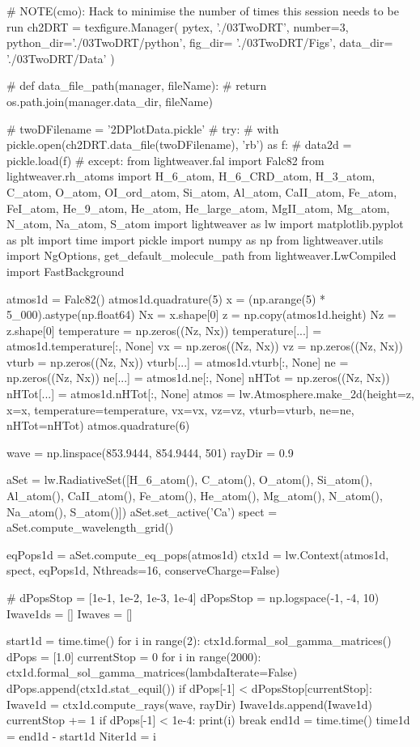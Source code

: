 \begin{pycode}[2DValidation]
# NOTE(cmo): Hack to minimise the number of times this session needs to be run
ch2DRT = texfigure.Manager(
    pytex,
    './03TwoDRT',
    number=3,
    python_dir='./03TwoDRT/python',
    fig_dir=   './03TwoDRT/Figs',
    data_dir=  './03TwoDRT/Data'
)

# def data_file_path(manager, fileName):
#     return os.path.join(manager.data_dir, fileName)

# twoDFilename = '2DPlotData.pickle'
# try:
#     with pickle.open(ch2DRT.data_file(twoDFilename), 'rb') as f:
#         data2d = pickle.load(f)
# except:
from lightweaver.fal import Falc82
from lightweaver.rh_atoms import H_6_atom, H_6_CRD_atom, H_3_atom, C_atom, O_atom, OI_ord_atom, Si_atom, Al_atom, CaII_atom, Fe_atom, FeI_atom, He_9_atom, He_atom, He_large_atom, MgII_atom, Mg_atom, N_atom, Na_atom, S_atom
import lightweaver as lw
import matplotlib.pyplot as plt
import time
import pickle
import numpy as np
from lightweaver.utils import NgOptions, get_default_molecule_path
from lightweaver.LwCompiled import FastBackground

atmos1d = Falc82()
atmos1d.quadrature(5)
x = (np.arange(5) * 5_000).astype(np.float64)
Nx = x.shape[0]
z = np.copy(atmos1d.height)
Nz = z.shape[0]
temperature = np.zeros((Nz, Nx))
temperature[...] = atmos1d.temperature[:, None]
vx = np.zeros((Nz, Nx))
vz = np.zeros((Nz, Nx))
vturb = np.zeros((Nz, Nx))
vturb[...] = atmos1d.vturb[:, None]
ne = np.zeros((Nz, Nx))
ne[...] = atmos1d.ne[:, None]
nHTot = np.zeros((Nz, Nx))
nHTot[...] = atmos1d.nHTot[:, None]
atmos = lw.Atmosphere.make_2d(height=z, x=x, temperature=temperature, vx=vx, vz=vz, vturb=vturb, ne=ne, nHTot=nHTot)
atmos.quadrature(6)

wave = np.linspace(853.9444, 854.9444, 501)
rayDir = 0.9

aSet = lw.RadiativeSet([H_6_atom(), C_atom(), O_atom(), Si_atom(), Al_atom(), CaII_atom(), Fe_atom(), He_atom(), Mg_atom(), N_atom(), Na_atom(), S_atom()])
aSet.set_active('Ca')
spect = aSet.compute_wavelength_grid()

eqPops1d = aSet.compute_eq_pops(atmos1d)
ctx1d = lw.Context(atmos1d, spect, eqPops1d, Nthreads=16, conserveCharge=False)

# dPopsStop = [1e-1, 1e-2, 1e-3, 1e-4]
dPopsStop = np.logspace(-1, -4, 10)
Iwave1ds = []
Iwaves = []

start1d = time.time()
for i in range(2):
    ctx1d.formal_sol_gamma_matrices()
dPops = [1.0]
currentStop = 0
for i in range(2000):
    ctx1d.formal_sol_gamma_matrices(lambdaIterate=False)
    dPops.append(ctx1d.stat_equil())
    if dPops[-1] < dPopsStop[currentStop]:
        Iwave1d = ctx1d.compute_rays(wave, rayDir)
        Iwave1ds.append(Iwave1d)
        currentStop += 1
    if dPops[-1] < 1e-4:
        print(i)
        break
end1d = time.time()
time1d = end1d - start1d
Niter1d = i


\end{pycode}
